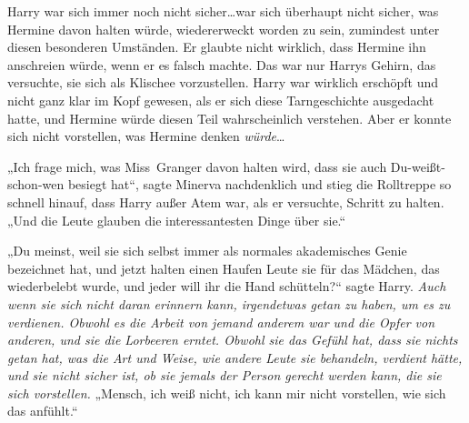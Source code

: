 Harry war sich immer noch nicht sicher…war sich überhaupt nicht sicher, was Hermine davon halten würde, wiedererweckt worden zu sein, zumindest unter diesen besonderen Umständen. Er glaubte nicht wirklich, dass Hermine ihn anschreien würde, wenn er es falsch machte. Das war nur Harrys Gehirn, das versuchte, sie sich als Klischee vorzustellen. Harry war wirklich erschöpft und nicht ganz klar im Kopf gewesen, als er sich diese Tarngeschichte ausgedacht hatte, und Hermine würde diesen Teil wahrscheinlich verstehen. Aber er konnte sich nicht vorstellen, was Hermine denken \emph{würde}…

„Ich frage mich, was Miss~Granger davon halten wird, dass sie auch Du-weißt-schon-wen besiegt hat“, sagte Minerva nachdenklich und stieg die Rolltreppe so schnell hinauf, dass Harry außer Atem war, als er versuchte, Schritt zu halten.
„Und die Leute glauben die interessantesten Dinge über sie.“

„Du meinst, weil sie sich selbst immer als normales akademisches Genie bezeichnet hat, und jetzt halten einen Haufen Leute sie für das Mädchen, das wiederbelebt wurde, und jeder will ihr die Hand schütteln?“ sagte Harry.
\emph{Auch wenn sie sich nicht daran erinnern kann, irgendetwas getan zu haben, um es zu verdienen. Obwohl es die Arbeit von jemand anderem war und die Opfer von anderen, und sie die Lorbeeren erntet. Obwohl sie das Gefühl hat, dass sie nichts getan hat, was die Art und Weise, wie andere Leute sie behandeln, verdient hätte, und sie nicht sicher ist, ob sie jemals der Person gerecht werden kann, die sie sich vorstellen.}
„Mensch, ich weiß nicht, ich kann mir nicht vorstellen, wie sich das anfühlt.“

